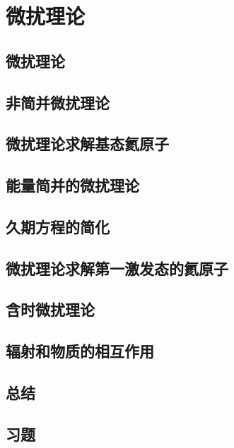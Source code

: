 \chapter{微扰理论}
\section{微扰理论}

\section{非简并微扰理论}

\section{微扰理论求解基态氦原子}

\section{能量简并的微扰理论}

\section{久期方程的简化}

\section{微扰理论求解第一激发态的氦原子}

\section{含时微扰理论}

\section{辐射和物质的相互作用}

\section*{总结}

\section*{习题}